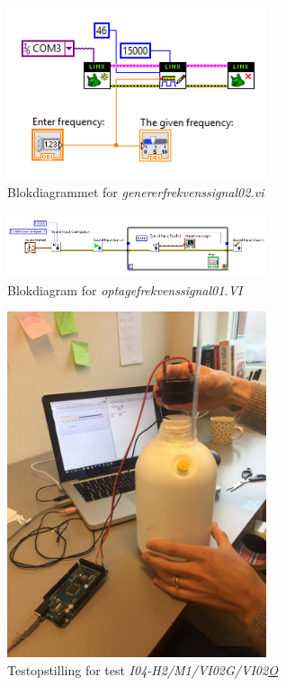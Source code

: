 		\begin{figure}[htb]
			\centering
				\includegraphics[width=3in]{gf02}
				\caption{Blokdiagrammet for \textit{genererfrekvenssignal02.vi}}	
				\label{fig:4gf02}
			\end{figure} 
\vspace{5mm}
			\begin{figure}[htb]
			\centering
				\includegraphics[width=3in]{of01}
				\caption{Blokdiagram for \textit{optagefrekvenssignal01.VI}}	
				\label{fig:4of01}
			\end{figure}
\vspace{5mm}

		\begin{figure}[h]
			\centering
				\includegraphics[width=3in]{bordtest4}
				\caption{Testopstilling for test \textit{I04-H2/M1/VI02G/VI02\underline{O}}}	
				\label{fig:bt4}
			\end{figure}
		


